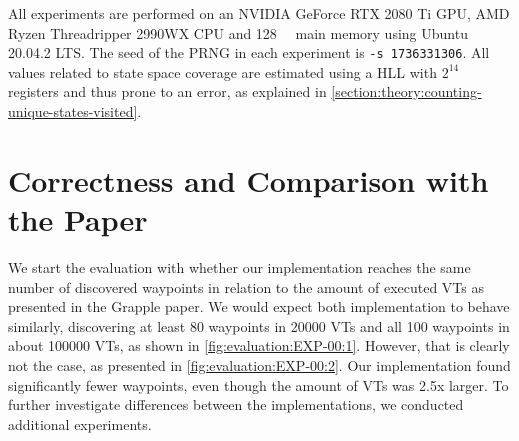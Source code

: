 \documentclass[
fancyheadings, %
%
%
]{stsreprt}
\begin{document}
All experiments are performed on an NVIDIA GeForce RTX 2080 Ti GPU, AMD Ryzen Threadripper 2990WX CPU and \SI{128}{\giga\byte} main memory using Ubuntu 20.04.2 LTS.
The seed of the PRNG in each experiment is \texttt{-s 1736331306}.
All values related to state space coverage are estimated using a HLL with $2^{14}$ registers and thus prone to an error, as explained in \cref{section:theory:counting-unique-states-visited}.

\section{Correctness and Comparison with the Paper}
\label{section:evaluation:correctness-comparison-with-paper}

We start the evaluation with whether our implementation reaches the same number of discovered waypoints in relation to the amount of executed VTs as presented in the Grapple paper.
We would expect both implementation to behave similarly, discovering at least 80 waypoints in \num{20000} VTs and all 100 waypoints in about \num{100000} VTs, as shown in \cref{fig:evaluation:EXP-00:1}.
However, that is clearly not the case, as presented in \cref{fig:evaluation:EXP-00:2}.
Our implementation found significantly fewer waypoints, even though the amount of VTs was 2.5x larger.
To further investigate differences between the implementations, we conducted additional experiments.
\end{document}
